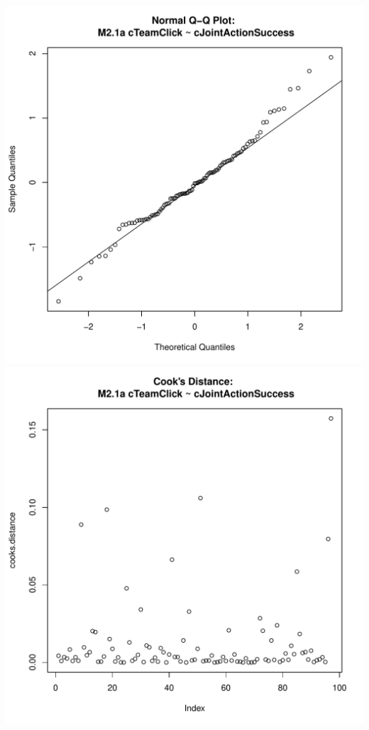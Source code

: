 \documentclass[12pt]{report}
\begin{document}
\includegraphics[scale =.4]{../images/MLM21aQQNorm.pdf}
\includegraphics[scale =.4]{../images/MLM21aCooksD.pdf}

\newpage
\centering

\end{document}
